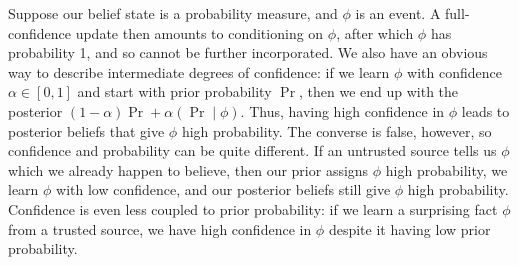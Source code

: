 \begin{example} \label{ex:prob-simple}
Suppose our belief state is a probability measure, and $\phi$ is an event. 
A full-confidence update then amounts to conditioning on $\phi$, after which $\phi$ has probability 1, and so cannot be further incorporated.
We also have an obvious way to describe intermediate degrees of confidence:
if we learn $\phi$ with confidence
$\alpha \in [0,1]$
and start with prior probability $\Pr$, then we end up with the
posterior $(1-\alpha)\Pr + \alpha (\Pr\mid \phi)$.
%
Thus, having high confidence in $\phi$ leads to posterior beliefs that give $\phi$
high probability.
The converse is false, however, so
confidence and probability can be quite different.
% 
If an untrusted source tells us $\phi$ which we already happen to believe, 
then our prior assigns $\phi$ high probability,
we learn $\phi$ with low confidence,
and our posterior beliefs still give $\phi$ high probability.  
Confidence is even less coupled to prior probability:
if we learn a surprising fact $\phi$ from a trusted source, we have high confidence in $\phi$ despite it having low prior probability.
\end{example}

